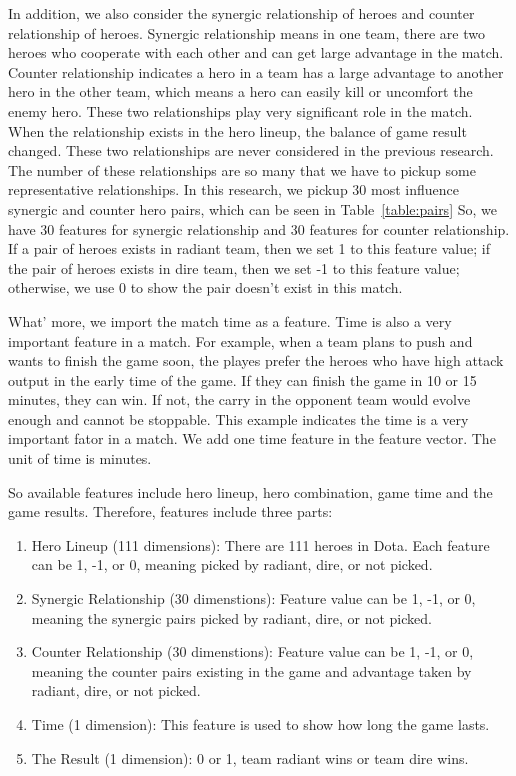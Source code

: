 In addition, we also consider the synergic relationship of heroes and counter relationship of heroes.
Synergic relationship means in one team, there are two heroes who cooperate with each other and
can get large advantage in the match.
Counter relationship indicates a hero in a team has a large advantage to another hero in the other team,
which means a hero can easily kill or uncomfort the enemy hero.
These two relationships play very significant role in the match.
When the relationship exists in the hero lineup, the balance of game result changed.
These two relationships are never considered in the previous research.
The number of these relationships are so many that we have to pickup some representative relationships.
In this research, we pickup 30 most influence synergic and counter hero pairs,
which can be seen in Table~\ref{table:pairs}
So, we have 30 features for synergic relationship and 30 features for counter relationship.
If a pair of heroes exists in radiant team, then we set 1 to this feature value;
if the pair of heroes exists in dire team, then we set -1 to this feature value;
otherwise, we use 0 to show the pair doesn't exist in this match.

What' more, we import the match time as a feature.
Time is also a very important feature in a match.
For example, when a team plans to push and wants to finish the game soon,
the playes prefer the heroes who have high attack output in the early time of the game.
If they can finish the game in 10 or 15 minutes, they can win.
If not, the carry in the opponent team would evolve enough and cannot be stoppable.
This example indicates the time is a very important fator in a match.
We add one time feature in the feature vector.
The unit of time is minutes.

So available features include hero lineup, hero combination, game time and the game results.
Therefore, features include three parts: 
\begin{enumerate}
\item Hero Lineup (111 dimensions): There are 111 heroes in Dota.
Each feature can be 1, -1, or 0, meaning picked by radiant, dire, or not picked.
\item Synergic Relationship (30 dimenstions):
Feature value can be 1, -1, or 0, meaning the synergic pairs picked by radiant, dire, or not picked.
\item Counter Relationship (30 dimenstions):
Feature value can be 1, -1, or 0, meaning the counter pairs existing in the game
and advantage taken by radiant, dire, or not picked.
\item Time (1 dimension):
This feature is used to show how long the game lasts.
\item The Result (1 dimension): 0 or 1, team radiant wins or team dire wins.
\end{enumerate}

